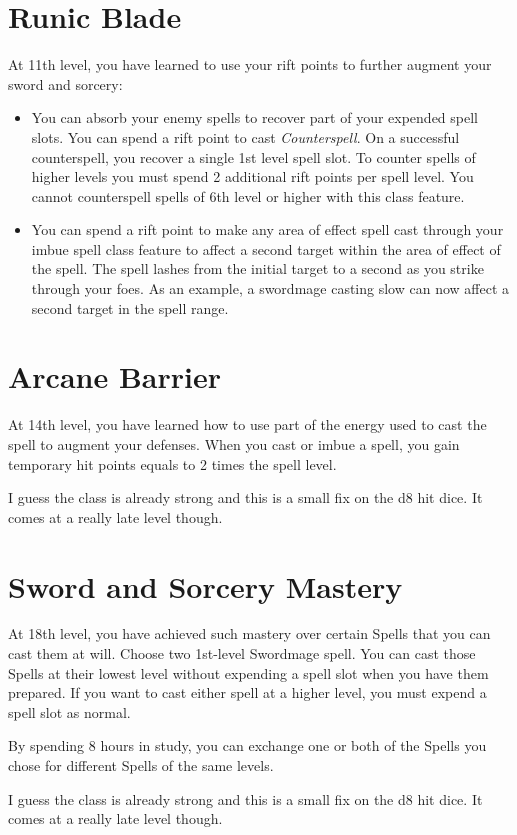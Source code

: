 \begin{multicols*}{2}
\section*{Runic Blade}


At 11th level, you have learned to use your rift points to further augment your sword and sorcery:

\begin{itemize}
    \item You can absorb your enemy spells to recover part of your expended spell slots.
    You can spend a rift point to cast \textit{Counterspell}.  On a successful counterspell, you recover a single 1st level spell slot. To counter spells of higher levels you must spend 2 additional rift points per spell level. 
    You cannot counterspell spells of 6th level or higher with this class feature.
    \item You can spend a rift point to make any area of effect spell cast through your imbue spell class feature to affect a second target within the area of effect of the spell. The spell lashes from the initial target to a second as you strike through your foes. As an example, a swordmage casting slow can now affect a second target in the spell range.
\end{itemize}


\section*{Arcane Barrier}


At 14th level, you have learned how to use part of the energy used to cast the spell to augment your defenses. When you cast or imbue a spell, you gain temporary hit points equals to 2 times the spell level.


\smallskip

{\color{red} I guess the class is already strong and this is a small fix on the d8 hit dice. It comes at a really late level though.  }



\section*{Sword and Sorcery Mastery}


At 18th level, you have achieved such mastery over certain Spells that you can cast them at will. Choose two 1st-level Swordmage spell. You can cast those Spells at their lowest level without expending a spell slot when you have them prepared. If you want to cast either spell at a higher level, you must expend a spell slot as normal.

By spending 8 hours in study, you can exchange one or both of the Spells you chose for different Spells of the same levels.


\smallskip

{\color{red} I guess the class is already strong and this is a small fix on the d8 hit dice. It comes at a really late level though.  }


\end{multicols*}

